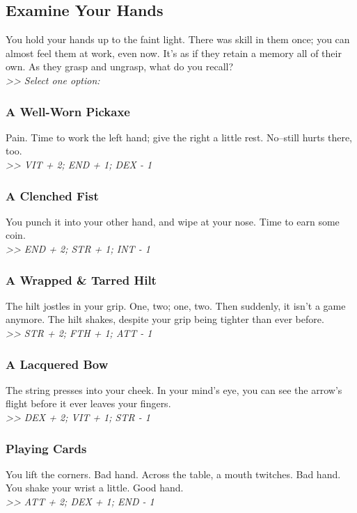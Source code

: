 \subsection*{Examine Your Hands}
You hold your hands up to the faint light. There was skill in them once; you can almost feel them at work, even now. It’s as if they retain a memory all of their own. As they grasp and ungrasp, what do you recall?\\
\emph{>> Select one option:}

\begin{multicols*}{2}
\subsubsection*{A Well-Worn Pickaxe}
Pain. Time to work the left hand; give the right a little rest. No--still hurts there, too.\\
\emph{>> VIT + 2; END + 1; DEX - 1}

\subsubsection*{A Clenched Fist}
You punch it into your other hand, and wipe at your nose. Time to earn some coin.\\
\emph{>> END + 2; STR + 1; INT - 1}

\subsubsection*{A Wrapped \& Tarred Hilt}
The hilt jostles in your grip. One, two; one, two. Then suddenly, it isn’t a game anymore. The hilt shakes, despite your grip being tighter than ever before.\\
\emph{>> STR + 2; FTH + 1; ATT - 1}

\subsubsection*{A Lacquered Bow}
The string presses into your cheek. In your mind’s eye, you can see the arrow’s flight before it ever leaves your fingers.\\
\emph{>> DEX + 2; VIT + 1; STR - 1}

\subsubsection*{Playing Cards}
You lift the corners. Bad hand. Across the table, a mouth twitches. Bad hand. You shake your wrist a little. Good hand.\\
\emph{>> ATT + 2; DEX + 1; END - 1}


\end{multicols*}
